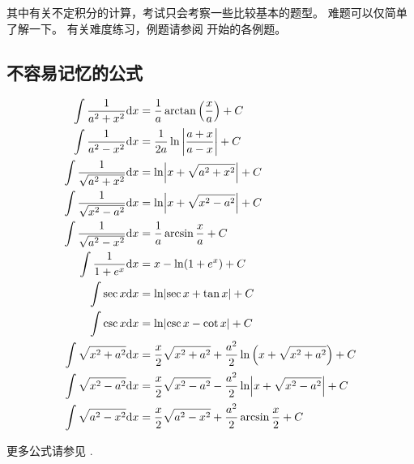其中有关不定积分的计算，考试只会考察一些比较基本的题型。
难题可以仅简单了解一下。
有关难度练习，例题请参阅 \cite[page 96]{we} 开始的各例题。

\subsection{不容易记忆的公式}

\begin{align}
    \int \dfrac{1}{{a^2 + x^2}}         \mathrm dx &= \dfrac{1}{a} \arctan \left( \dfrac{x}{a} \right)      + C\\
    \int \dfrac{1}{{a^2 - x^2}}         \mathrm dx &= \dfrac{1}{2a} \ln \left| \dfrac{a + x}{a - x} \right| + C\\
    \int \dfrac{1}{{\sqrt{a^2 + x^2}}}  \mathrm dx &= \ln               \abs*{ x + \sqrt{a^2 + x^2} }       + C\\
    \int \dfrac{1}{{\sqrt{x^2 - a^2}}}  \mathrm dx &= \ln               \abs*{ x + \sqrt{x^2 - a^2} }       + C\\
    \int \dfrac{1}{{\sqrt{a^2 - x^2}}}  \mathrm dx &= \frac{1}{a} \arcsin \frac{x}{a}                       + C\\
    \int \dfrac{1}{{1+e^x}}             \mathrm dx &= x - \ln (1+ e^x)                                      + C\\
    \int \sec x                         \mathrm dx &= \ln \abs*{\sec x + \tan x }                           + C\\ 
    \int \csc x                         \mathrm dx &= \ln \abs*{\csc x - \cot x }                           + C\\ 
    \int \sqrt{x^2 + a^2}               \mathrm dx &= \frac{x}{2} \sqrt{x^2 + a^2} + \frac{a^2}{2} \ln \left(x + \sqrt{x^2 + a^2}\right) + C\\
    \int \sqrt{x^2 - a^2}               \mathrm dx &= \frac{x}{2} \sqrt{x^2 - a^2} - \frac{a^2}{2} \ln \abs*{x + \sqrt{x^2 - a^2}} + C\\
    \int \sqrt{a^2 - x^2}               \mathrm dx &= \frac{x}{2} \sqrt{a^2 - x^2} + \frac{a^2}{2} \arcsin \frac{x}{2} + C
\end{align}

更多公式请参见 \cite[page 93, pdf 104]{we}.

